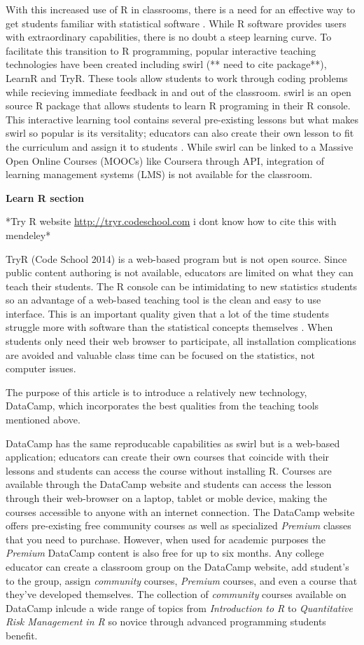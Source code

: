 \documentclass[12pt]{article}
\begin{document}
With this increased use of R in classrooms, there is a need for an effective way to get students familiar with statistical software
\citep{Baumer2014}. While R software provides users with extraordinary capabilities, there is no doubt a steep learning curve. To facilitate
this transition to R programming, popular interactive teaching technologies have been created including swirl (** need to cite package**), LearnR and TryR. 
These tools allow students to work through coding problems while recieving immediate feedback in and out of the classroom. swirl is an
open source R package that allows students to learn R programing in their R console. This interactive learning tool
contains several pre-existing lessons but what makes swirl so popular is its versitality; educators can also create their own
lesson to fit the curriculum and assign it to students \citep{Carchedi2014}.
While swirl can be linked to a Massive Open Online Courses (MOOCs) like Coursera through API, integration of learning management 
systems (LMS) is not available for the classroom. 

\textbf{Learn R section}


*Try R website  \url{http://tryr.codeschool.com} i dont know how to cite this with mendeley*

TryR (Code School 2014) is a web-based program but is not open source. Since public content authoring
is not available, educators are limited on what they can teach their students. The R console can be intimidating to
new statistics students so an advantage of a web-based teaching tool is
the clean and easy to use interface. This is an important quality given that a lot of the time students struggle more with
software than the statistical concepts themselves \citep{Hare2017}. When students only need their web browser to participate,
all installation complications are avoided and valuable class time can be focused on the statistics, not computer issues.

The purpose of this article is to introduce a relatively new technology, DataCamp, which incorporates the best
qualities from the teaching tools mentioned above.

DataCamp has the same reproducable capabilities as swirl but is a web-based application; educators can
create their own courses that coincide with their lessons and students can access the course without installing R.
Courses are available through the DataCamp website and students can access the lesson through their web-browser on a laptop,
tablet or moble device, making the courses accessible to anyone with an internet connection. 
The DataCamp website offers pre-existing free community courses as well as specialized \textit{Premium} classes that you need to purchase. 
However, when used for academic purposes the \textit{Premium} DataCamp content is also free for up to six months.
Any college educator can create a classroom group on the DataCamp website, add student's to the group, assign 
\textit{community} courses, \textit{Premium} courses, and even a course that they've developed themselves. 
The collection of \textit{community} courses available on DataCamp inlcude a wide range of topics from \textit{Introduction to R} to
\textit{Quantitative Risk Management in R} so novice through advanced programming students benefit.
\end{document}
